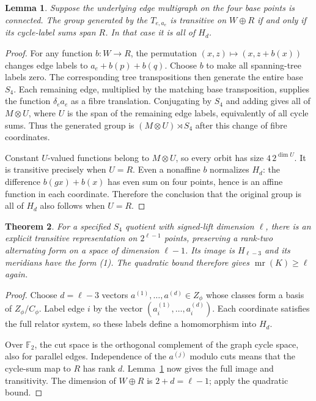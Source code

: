 \documentclass[11pt]{article}
\newtheorem{theorem}{Theorem}
\newtheorem{lemma}[theorem]{Lemma}
\newcommand{\F}{\mathbb F}
\newcommand{\mr}{\operatorname{mr}}
\begin{document}
\begin{lemma}\label{lem:vectorgraph}
Suppose the underlying edge multigraph on the four base points is
connected. The group generated by the $T_{e,a_e}$ is transitive on
$W\oplus R$ if and only if its cycle-label sums span $R$.
In that case it is all of $H_d$.
\end{lemma}
\begin{proof}
For any function $b:W\to R$, the permutation
$(x,z)\mapsto(x,z+b(x))$ changes edge labels to
$a_e+b(p)+b(q)$. Choose $b$ to make all spanning-tree labels zero.
The corresponding tree transpositions then generate the entire base
$S_4$. Each remaining edge, multiplied by the matching base
transposition, supplies the function $\delta_e a_e$ as a fibre
translation. Conjugating by $S_4$ and adding gives all of $M\otimes U$,
where $U$ is the span of the remaining edge labels, equivalently of all
cycle sums. Thus the generated group is
$(M\otimes U)\rtimes S_4$ after this change of fibre coordinates.

Constant $U$-valued functions belong to $M\otimes U$, so every orbit has
size $4\,2^{\dim U}$. It is transitive precisely when $U=R$.
Even a nonaffine $b$ normalizes $H_d$: the difference
$b(gx)+b(x)$ has even sum on four points, hence is an affine function
in each coordinate. Therefore the conclusion that the original group
is all of $H_d$ also follows when $U=R$.
\end{proof}

\begin{theorem}\label{thm:tower}
For a specified $S_4$ quotient with signed-lift dimension $\ell$, there
is an explicit transitive representation on $2^{\ell-1}$ points,
preserving a rank-two alternating form on a space of dimension $\ell-1$.
Its image is $H_{\ell-3}$ and its meridians have the form (1).
The quadratic bound therefore gives $\mr(K)\ge\ell$ again.
\end{theorem}
\begin{proof}
Choose $d=\ell-3$ vectors $a^{(1)},\ldots,a^{(d)}\in Z_\phi$ whose
classes form a basis of $Z_\phi/C_\phi$. Label edge $i$ by the vector
$(a_i^{(1)},\ldots,a_i^{(d)})$. Each coordinate satisfies the full
relator system, so these labels define a homomorphism into $H_d$.

Over $\F_2$, the cut space is the orthogonal complement of the graph
cycle space, also for parallel edges. Independence of the $a^{(j)}$
modulo cuts means that the cycle-sum map to $R$ has rank $d$.
Lemma~\ref{lem:vectorgraph} now gives the full image and transitivity.
The dimension of $W\oplus R$ is $2+d=\ell-1$; apply the quadratic bound.
\end{proof}
\end{document}
